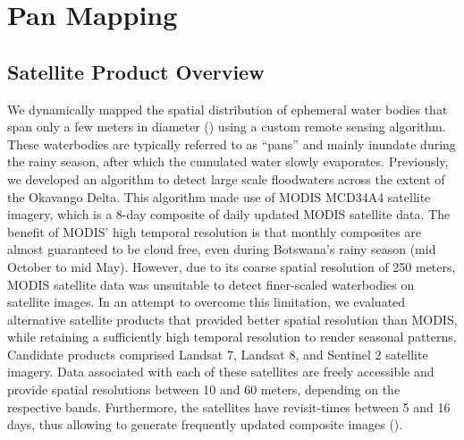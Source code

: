\documentclass[../FinalThesis.tex]{subfiles}
\begin{document}
\newpage

\newpage
\section{Pan Mapping}
\label{PanMappingApproach}

\subsection{Satellite Product Overview}

We dynamically mapped the spatial distribution of ephemeral water bodies that
span only a few meters in diameter () using a custom remote sensing
algorithm. These waterbodies are typically referred to as ``pans'' and mainly
inundate during the rainy season, after which the cumulated water slowly
evaporates. Previously, we developed an algorithm to detect large scale
floodwaters across the extent of the Okavango Delta. This algorithm made use of
MODIS MCD34A4 satellite imagery, which is a 8-day composite of daily updated
MODIS satellite data. The benefit of MODIS' high temporal resolution is that
monthly composites are almost guaranteed to be cloud free, even during
Botswana's rainy season (mid October to mid May). However, due to its coarse
spatial resolution of 250 meters, MODIS satellite data was unsuitable to detect
finer-scaled waterbodies on satellite images. In an attempt to overcome this
limitation, we evaluated alternative satellite products that provided better
spatial resolution than MODIS, while retaining a sufficiently high temporal
resolution to render seasonal patterns. Candidate products comprised Landsat 7,
Landsat 8, and Sentinel 2 satellite imagery. Data associated with each of these
satellites are freely accessible and provide spatial resolutions between 10 and
60 meters, depending on the respective bands. Furthermore, the satellites have
revisit-times between 5 and 16 days, thus allowing to generate frequently
updated composite images ().
\end{document}
